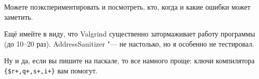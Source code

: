 Можете поэкспериментировать и посмотреть, кто, когда и какие ошибки может заметить.

Ещё имейте в виду, что Valgrind существенно затормаживает работу программы (до 10--20 раз). 
Address\-Sanitizer "--- не настолько, но я особенно не тестировал.

Ну и да, если вы пишите на паскале, то все намного проще: ключи компилятора \verb`{$r+,q+,s+,i+}` вам помогут.

